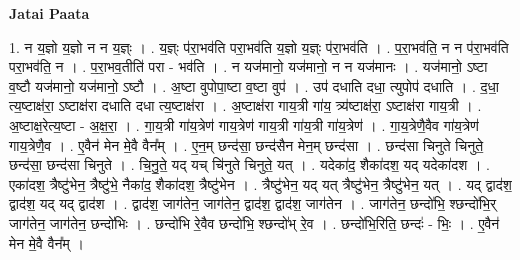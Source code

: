 \documentclass[17pt]{extarticle}
\begin{document}
\textbf{Jatai Paata} \newline

1. न य॒ज्ञो य॒ज्ञो न न य॒ज्ञ्ः । . य॒ज्ञ्ः प॑रा॒भव॑ति परा॒भव॑ति य॒ज्ञो य॒ज्ञ्ः प॑रा॒भव॑ति । . प॒रा॒भव॑ति॒ न न प॑रा॒भव॑ति परा॒भव॑ति॒ न । . प॒रा॒भव॒तीति॑ परा - भव॑ति । . न यज॑मानो॒ यज॑मानो॒ न न यज॑मानः । . यज॑मानो॒ ऽष्टा व॒ष्टौ यज॑मानो॒ यज॑मानो॒ ऽष्टौ । . अ॒ष्टा वुपोपा॒ष्टा व॒ष्टा वुप॑ । . उप॑ दधाति दधा॒ त्युपोप॑ दधाति । . द॒धा॒ त्य॒ष्टाक्ष॑रा॒ ऽष्टाक्ष॑रा दधाति दधा त्य॒ष्टाक्ष॑रा । . अ॒ष्टाक्ष॑रा गाय॒त्री गा॑य॒ त्र्य॑ष्टाक्ष॑रा॒ ऽष्टाक्ष॑रा गाय॒त्री । . अ॒ष्टाक्ष॒रेत्य॒ष्टा - अ॒क्ष॒रा॒ । . गा॒य॒त्री गा॑य॒त्रेण॑ गाय॒त्रेण॑ गाय॒त्री गा॑य॒त्री गा॑य॒त्रेण॑ । . गा॒य॒त्रेणै॒वैव गा॑य॒त्रेण॑ गाय॒त्रेणै॒व । . ए॒वैन॑ मेन मे॒वै वैन᳚म् । . ए॒न॒म् छन्द॑सा॒ छन्द॑सैन मेन॒म् छन्द॑सा । . छन्द॑सा चिनुते चिनुते॒ छन्द॑सा॒ छन्द॑सा चिनुते । . चि॒नु॒ते॒ यद् यच् चि॑नुते चिनुते॒ यत् । . यदेका॑द॒ शैका॑दश॒ यद् यदेका॑दश । . एका॑दश॒ त्रैष्टु॑भेन॒ त्रैष्टु॑भे॒ नैका॑द॒ शैका॑दश॒ त्रैष्टु॑भेन । . त्रैष्टु॑भेन॒ यद् यत् त्रैष्टु॑भेन॒ त्रैष्टु॑भेन॒ यत् । . यद् द्वाद॑श॒ द्वाद॑श॒ यद् यद् द्वाद॑श । . द्वाद॑श॒ जाग॑तेन॒ जाग॑तेन॒ द्वाद॑श॒ द्वाद॑श॒ जाग॑तेन । . जाग॑तेन॒ छन्दो॑भि॒ श्छन्दो॑भि॒र् जाग॑तेन॒ जाग॑तेन॒ छन्दो॑भिः । . छन्दो॑भि रे॒वैव छन्दो॑भि॒ श्छन्दो॑भ् रे॒व । . छन्दो॑भि॒रिति॒ छन्दः॑ - भिः॒ । . ए॒वैन॑ मेन मे॒वै वैन᳚म् । \newline
\end{document}
